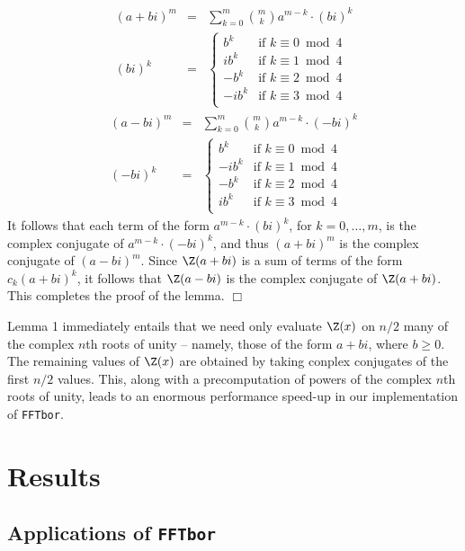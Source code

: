 \begin{eqnarray*}
(a+bi)^m &=& \sum_{k=0}^m {m \choose k} a^{m-k}\cdot  (bi)^k \\
(bi)^k  &=& \left\{
\begin{array}{ll}
b^k &\mbox{if $k \equiv 0 \bmod 4$}\\
i b^k &\mbox{if $k \equiv 1 \bmod 4$}\\
-b^k &\mbox{if $k \equiv 2 \bmod 4$}\\
-i b^k &\mbox{if $k \equiv 3 \bmod 4$}\\
\end{array} \right.
\end{eqnarray*}
\begin{eqnarray*}
(a-bi)^m &=& \sum_{k=0}^m {m \choose k} a^{m-k} \cdot (-bi)^k \\
(-bi)^k &=& \left\{
\begin{array}{ll}
b^k &\mbox{if $k \equiv 0 \bmod 4$}\\
-ib^k &\mbox{if $k \equiv 1 \bmod 4$}\\
-b^k &\mbox{if $k \equiv 2 \bmod 4$}\\
ib^k &\mbox{if $k \equiv 3 \bmod 4$}\\
\end{array} \right.
\end{eqnarray*}
It follows that each term of the form
$a^{m-k} \cdot (bi)^k$, for $k=0,\ldots,m$, is the complex conjugate of
$a^{m-k} \cdot (-bi)^k$, and thus $(a+bi)^m$ is the complex conjugate of
$(a-bi)^m$. Since $\Z(a+bi)$ is a sum of terms of the form $c_k (a+bi)^k$,
it follows that $\Z(a-bi)$ is the complex conjugate of $\Z(a+bi)$.
This completes the proof of the lemma. \hfill  $\Box$
\medskip

Lemma 1 immediately entails that we need only evaluate $\Z(x)$ on $n/2$
many of the complex $n$th roots of unity -- namely, those of the form
$a+bi$, where $b \geq 0$. The remaining values of $\Z(x)$ are obtained by
taking conplex conjugates of the first $n/2$ values. This, along with a
precomputation of powers of the complex $n$th roots of unity, leads to an
enormous performance speed-up in our implementation of {\tt FFTbor}.

\section*{Results}
\subsection*{Applications of {\tt FFTbor}}
\label{section:applications}


